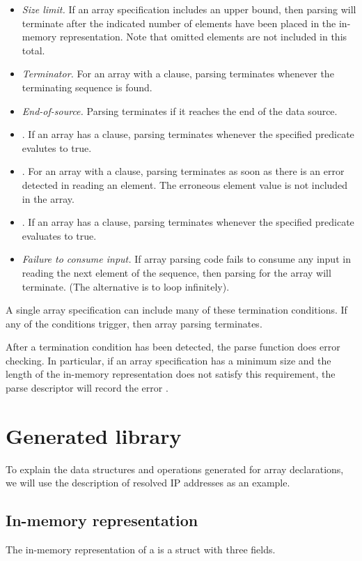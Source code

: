 \begin{itemize}
\item{\textit{Size limit.}} If an array specification includes an upper bound,
  then parsing will terminate after the indicated number of elements
  have been placed in the in-memory representation.  Note that omitted
  elements are not included in this total.
\item\textit{Terminator.} For an array with a \Pterm{} clause, parsing
  terminates whenever the terminating sequence is found.
\item\textit{End-of-source.} Parsing terminates if it reaches the end of the
  data source.
\item{\Plast{}.} If an array has a \Plast{} clause, parsing terminates
  whenever the specified predicate evalutes to true.
\item{\Plongest{}.} For an array with a \Plongest{} clause, parsing terminates
  as soon as there is an error detected in reading an element.  The
  erroneous element value is not included in the array.
\item{\Pended{}.} If an array has a \Pended{} clause, parsing
  terminates whenever the specified predicate evaluates to true.
\item{\textit{Failure to consume input.}} If array parsing code fails
  to consume any input in reading the next element of the sequence,
  then parsing for the array will terminate.  (The alternative is to
  loop infinitely).
\end{itemize}
A single array specification can include many of these termination
conditions.  If any of the conditions trigger, then array parsing
terminates.  

After a termination condition has been detected, the parse function
does error checking.  In particular,
if an array specification has a minimum size and the
length of the in-memory representation does not satisfy this
requirement, the parse descriptor will record the error 
.  


\section{Generated library}
To explain the data structures and operations generated for array
declarations, we will use the description of resolved IP addresses as
an example.


\subsection{In-memory representation}
\label{sec:arrays-rep}
The in-memory representation of a \Parray{} is a struct with three
fields.  

